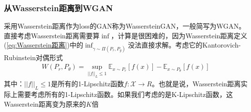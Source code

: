         \subsubsection{从Wasserstein距离到WGAN}
            \par
            采用Wasserstein距离作为loss的GAN称为WassersteinGAN，一般简写为WGAN。直接考虑Wasserstein距离需要算$\inf$，计算是很困难的，因为Wasserstein距离定义(\ref{eq:Wasserstein距离})中的$\inf_{\gamma \sim \Pi (P_r, P_g)}$没法直接求解。考虑它的Kantorovich-Rubinstein对偶形式
            \begin{align*}
            W(P_r,P_\theta) = \sup_{||f||_L \leqslant 1}\mathbb{E}_{x\sim P_r}[f(x)] - \mathbb{E}_{x\sim P_\theta}[f(x)]
            \end{align*}
            其中：$||f||_L \leqslant 1$是所有的1-Lipschitz函数$f:\mathcal{X}\to R$。也就是说，Wasserstein距离实际上需要考虑所有的1-Lipschitz函数。如果我们考虑的是K-Lipschitz函数，这Wasserstein距离变为原来的$K$倍

